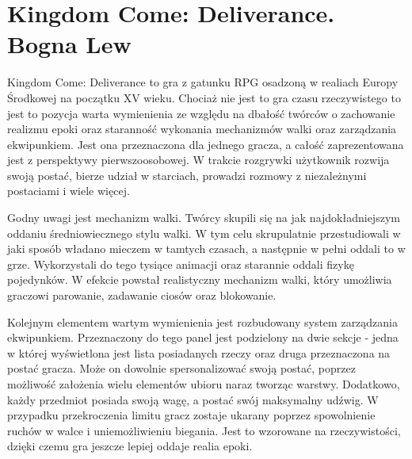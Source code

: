 \section{Kingdom Come: Deliverance. Bogna Lew}

Kingdom Come: Deliverance to gra z gatunku RPG osadzoną w realiach Europy Środkowej na początku XV wieku. Chociaż nie
jest to gra czasu rzeczywistego to jest to pozycja warta wymienienia ze względu na dbałość twórców o zachowanie realizmu
epoki oraz staranność wykonania mechanizmów walki oraz zarządzania ekwipunkiem. Jest ona przeznaczona dla jednego gracza,
a całość zaprezentowana jest z perspektywy pierwszoosobowej. W trakcie rozgrywki użytkownik rozwija swoją postać, bierze
udział w starciach, prowadzi rozmowy z niezależnymi postaciami i wiele więcej.

Godny uwagi jest mechanizm walki. Twórcy skupili się na jak najdokładniejszym oddaniu średniowiecznego stylu walki. W tym
celu skrupulatnie przestudiowali w jaki sposób władano mieczem w tamtych czasach, a następnie w pełni oddali to w grze.
Wykorzystali do tego tysiące animacji oraz starannie oddali fizykę pojedynków. W efekcie powstał realistyczny mechanizm
walki, który umożliwia graczowi parowanie, zadawanie ciosów oraz blokowanie.

Kolejnym elementem wartym wymienienia jest rozbudowany system zarządzania ekwipunkiem. Przeznaczony do tego panel jest
podzielony na dwie sekcje - jedna w której wyświetlona jest lista posiadanych rzeczy oraz druga przeznaczona na postać
gracza. Może on dowolnie spersonalizować swoją postać, poprzez możliwość założenia wielu elementów ubioru naraz tworząc
warstwy.  Dodatkowo, każdy przedmiot posiada swoją wagę, a postać swój maksymalny udźwig. W przypadku przekroczenia limitu
gracz zostaje ukarany poprzez spowolnienie ruchów w walce i uniemożliwieniu biegania. Jest to wzorowane na rzeczywistości,
dzięki czemu gra jeszcze lepiej oddaje realia epoki.

